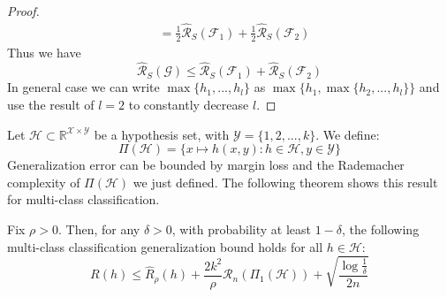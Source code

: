 \begin{proof}
\begin{align}
	&= \frac{1}{2}\hat{\mathcal{R}}_S(\mathcal{F}_1) + \frac{1}{2}\hat{\mathcal{R}}_S(\mathcal{F}_2)
	\end{align}
	Thus we have
	\begin{equation}
	\hat{\mathcal{R}}_S(\mathcal{G}) \leq \hat{\mathcal{R}}_S(\mathcal{F}_1) + \hat{\mathcal{R}}_S(\mathcal{F}_2)
	\end{equation}
	In general case we can write $\max\{h_1,...,h_l\}$ as $\max\{h_1, \max\{h_2,...,h_l\} \}$ and use the result of $l=2$ to constantly decrease $l$.
\end{proof}
Let $\mathcal{H} \subset \mathbb{R}^{\mathcal{X} \times \mathcal{Y}}$ be a hypothesis set, with $\mathcal{Y}=\{1,2,...,k\}$. We define:
\begin{equation}
\Pi (\mathcal{H}) = \{x\mapsto h(x,y) : h \in \mathcal{H}, y\in \mathcal{Y}\}
\end{equation}
Generalization error can be bounded by margin loss and the Rademacher complexity of $\Pi (\mathcal{H})$ we just defined. The following theorem shows this result for multi-class classification.
\begin{theorem}
	Fix $\rho>0$. Then, for any $\delta>0$, with probability at least $1-\delta$, the following multi-class classification generalization bound holds for all $h \in \mathcal{H}$:
	\begin{equation}
	R(h) \leq \hat{R}_\rho (h) +\frac{2k^2}{\rho} \mathcal{R}_n(\Pi_1(\mathcal{H})) + \sqrt{\frac{\log\frac{1}{\delta}}{2n}}
	\end{equation}
\end{theorem}
